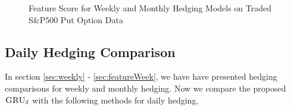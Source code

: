 \documentclass[letterpaper,12pt,titlepage,oneside,final]{book}
\numberwithin{equation}{section}
\theoremstyle{definition}
\newcommand{\model}{\textsc{GRU}_\delta}
\newcommand{\DKLs}{\bf\textsc{DKL}_{\text{SPL}}}
\begin{document}
\begin{figure}[htp]
\centering
\caption{Feature Score for Weekly and Monthly Hedging Models on Traded S\&P500 Put Option  Data} \label{fig:put1}
\end{figure}

\subsection{Daily Hedging Comparison}\label{sec:daily}
In section \ref{sec:weekly} - \ref{sec:featureWeek}, we have have presented hedging comparisons for weekly and monthly hedging. Now we compare the proposed $\model$  with the following methods for daily hedging,

\end{document}
